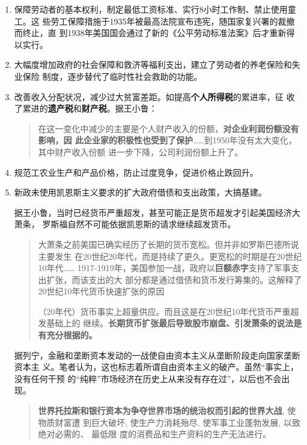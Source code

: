 \begin{enumerate}
\item 保障劳动者的基本权利，制定最低工资标准、实行8小时工作制、禁止使用童工。这
  些劳工保障措施于1935年被最高法院宣布违宪，随国家复兴署的裁撤而终止，直
  到1938年美国国会通过了新的《公平劳动标准法案》后才重新得以实行。

\item 大幅度增加政府的社会保障和救济等福利支出，建立了劳动者的养老保险和失业保险
  制度，逐步替代了临时性社会救助的功能。

\item 改善收入分配状况，减少过大贫富差距。如提高\textbf{个人所得税}的累进率，征
  收了累进的\textbf{遗产税}和\textbf{财产税}。据王小鲁：
  \begin{quotation}
    在这一变化中减少的主要是个人财产收入的份额，\textbf{对企业利润份额没有影响，因
      此企业家的积极性也受到了保护}……到1950年没有太大变化，其中财产收入份额
    进一步下降，公司利润份额上升了。
\end{quotation}

\item 规范工农业生产和产品价格，防止过度竞争，促进价格止跌回升。

\item 新政未使用凯恩斯主义要求的扩大政府借债和支出政策，大搞基建。

  据王小鲁，当时已经货币严重超发，甚至可能正是货币超发才引起美国经济大萧条，
  罗斯福自然不可能依据凯恩斯的请求继续超发货币。
  \begin{quotation}
    大萧条之前美国已确实经历了长期的货币宽松。但并非如罗斯巴德所说主要发生
    在20世纪20年代，而是持续了更久。更宽松的时期是在20世纪10年代……
    1917-1919年，美国参加一战，政府以\textbf{巨额赤字}支持了军事支出扩张，而该支出的大
    部分都是通过借债和货币发行筹集的。这解释了20世纪10年代货币快速扩张的原因

    （20年代）货币事实上超量供应。而且这是在20世纪10年代货币严重超发基础上的
    继续。\textbf{长期货币扩张最后导致股市崩盘、引发萧条的说法是有充分根据的。}
  \end{quotation}

  据列宁，金融和垄断资本发动的一战使自由资本主义从垄断阶段走向国家垄断资本主
  义。笔者认为，这也标志着所谓自由资本主义的破产。虽然“事实上，没有任何干预
  的“纯粹”市场经济在历史上从来没有存在过”，以后也不会出现。
  \begin{quotation}
    \textbf{世界托拉斯和银行资本为争夺世界市场的统治权而引起的世界大战}, 使物质财富遭
    到巨大破坏, 使生产力消耗殆尽, 使军事工业蓬勃发展, 以致绝对必需的、 最低限
    度的消费品和生产资料的生产无法进行。


\end{quotation}
\end{enumerate}
